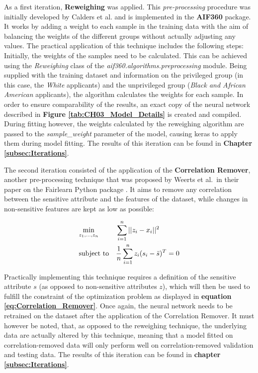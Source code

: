 As a first iteration, \textbf{Reweighing} was applied. This \textit{pre-processing} procedure was initially developed by Calders et al. \parencite{Calders2009} and is implemented in the \textbf{AIF360} package. It works by adding a weight to each sample in the training data with the aim of balancing the weights of the different groups without actually adjusting any values.
The practical application of this technique includes the following steps: Initially, the weights of the samples need to be calculated. This can be achieved using the \textit{Reweighing} class of the \textit{aif360.algorithms.preprocessing} module. Being supplied with the training dataset and information on the privileged group (in this case, the \textit{White} applicants) and the unprivileged group (\textit{Black and African American} applicants), the algorithm calculates the weights for each sample. 
In order to ensure comparability of the results, an exact copy of the neural network described in \textbf{Figure \ref{tab:CH03_Model_Details}} is created and compiled. During fitting however, the weights calculated by the reweighing algorithm are passed to the \textit{sample\_weight} parameter of the model, causing keras to apply them during model fitting. The results of this iteration can be found in \textbf{Chapter \ref{subsec:Iterations}}.

The second iteration consisted of the application of the \textbf{Correlation Remover}, another pre-processing technique that was proposed by Weerts et al.\ in their paper on the Fairlearn Python package \parencite{Weerts2023}. It aims to remove any correlation between the sensitive attribute and the features of the dataset, while changes in non-sensitive features are kept as low as possible:

\begin{equation}
    \begin{aligned}
        & \underset{z_1, \ldots, z_n}{\text{min}}
        & & \sum_{i=1}^n ||z_i - x_i||^2 \\
        & \text{subject to}
        & & \frac{1}{n} \sum_{i=1}^n z_i (s_i - \bar{s})^T = 0
        \end{aligned}
    \label{eq:Correlation_Remover}
    \addcontentsline{frm}{formulas}{\protect\numberline{\theequation}\hspace{1em}Correlation Remover}
\end{equation}

Practically implementing this technique requires a definition of the sensitive attribute $s$ (as opposed to non-sensitive attributes $z$), which will then be used to fulfill the constraint of the optimization problem as displayed in \textbf{equation \ref{eq:Correlation_Remover}}. 
Once again, the neural network needs to be retrained on the dataset after the application of the Correlation Remover. It must however be noted, that, as opposed to the reweighing technique, the underlying data are actually altered by this technique, meaning that a model fitted on correlation-removed data will only perform well on correlation-removed validation and testing data. The results of this iteration can be found in \textbf{chapter \ref{subsec:Iterations}}.

